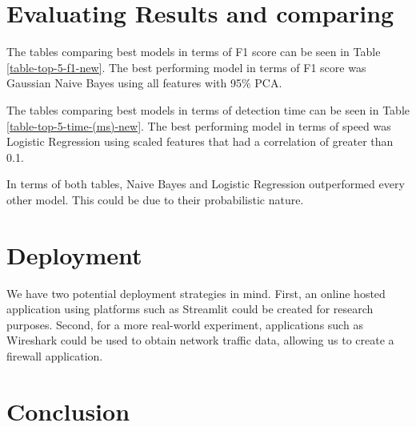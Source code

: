 \section{Evaluating Results and comparing}
The tables comparing best models in terms of F1 score can be seen in Table \ref{table-top-5-f1-new}. The best performing model in terms of F1 score was Gaussian Naive Bayes using all features with 95\% PCA.


The tables comparing best models in terms of detection time can be seen in Table \ref{table-top-5-time-(ms)-new}. The best performing model in terms of speed was Logistic Regression using scaled features that had a correlation of greater than 0.1.



In terms of both tables, Naive Bayes and Logistic Regression outperformed every other model. This could be due to their probabilistic nature.





\section{Deployment}
We have two potential deployment strategies in mind. First, an online hosted application using platforms such as Streamlit could be created for research purposes. Second, for a more real-world experiment, applications such as Wireshark could be used to obtain network traffic data, allowing us to create a firewall application.



\section{Conclusion}

